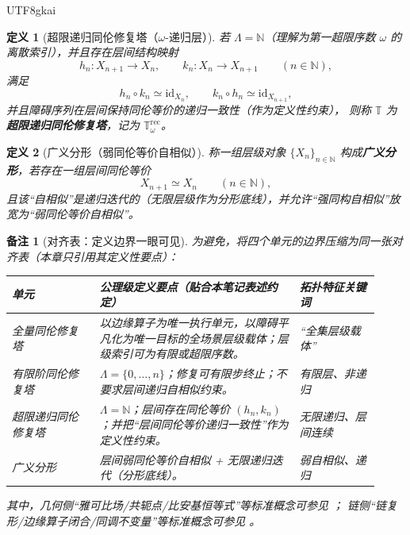 \documentclass[12pt]{article}
\newtheorem{definition}{定义}[section]
\newtheorem{remark}{备注}[section]
\newcommand{\NN}{\mathbb{N}}
\newcommand{\KouJing}{\texorpdfstring{表述约定}{表述约定}}
\begin{document}
\begin{CJK*}{UTF8}{gkai}
\begin{definition}[超限递归同伦修复塔（$\omega$-递归层）]
若 $\Lambda=\NN$（理解为第一超限序数 $\omega$ 的离散索引），并且存在层间结构映射
\[
  h_n:X_{n+1}\to X_n,\qquad
  k_n:X_n\to X_{n+1}\qquad (n\in\NN),
\]
满足
\[
  h_n\circ k_n\simeq \mathrm{id}_{X_n},
  \qquad
  k_n\circ h_n\simeq \mathrm{id}_{X_{n+1}},
\]
并且障碍序列在层间保持同伦等价的递归一致性（作为定义性约束），
则称 $\mathbb{T}$ 为\textbf{超限递归同伦修复塔}，记为 $\mathbb{T}_{\omega}^{\mathrm{rec}}$。
\end{definition}

\begin{definition}[广义分形（弱同伦等价自相似）]
称一组层级对象 $\{X_n\}_{n\in\NN}$ 构成\textbf{广义分形}，若存在一组层间同伦等价
\[
  X_{n+1}\simeq X_n\qquad (n\in\NN),
\]
且该“自相似”是递归迭代的（无限层级作为分形底线），并允许“强同构自相似”放宽为“弱同伦等价自相似”。
\end{definition}

\begin{remark}[对齐表：定义边界一眼可见]
为避免，将四个单元的边界压缩为同一张对齐表（本章只引用其定义性要点）：
\begin{center}
\renewcommand{\arraystretch}{1.25}
\begin{tabular}{|p{0.22\linewidth}|p{0.50\linewidth}|p{0.20\linewidth}|}
\hline
\textbf{单元} & \textbf{公理级定义要点（贴合本笔记\KouJing）} & \textbf{拓扑特征关键词} \\
\hline
全量同伦修复塔 &
以边缘算子为唯一执行单元，以障碍平凡化为唯一目标的全场景层级载体；层级索引可为有限或超限序数。 &
“全集层级载体” \\
\hline
有限阶同伦修复塔 &
$\Lambda=\{0,\dots,n\}$；修复可有限步终止；不要求层间递归自相似约束。 &
有限层、非递归 \\
\hline
超限递归同伦修复塔 &
$\Lambda=\NN$；层间存在同伦等价 $(h_n,k_n)$；并把“层间同伦等价递归一致性”作为定义性约束。 &
无限递归、层间连续 \\
\hline
广义分形 &
层间弱同伦等价自相似 + 无限递归迭代（分形底线）。 &
弱自相似、递归 \\
\hline
\end{tabular}
\end{center}
其中，几何侧“雅可比场/共轭点/比安基恒等式”等标准概念可参见 \cite{Lee2018RiemannianManifolds,Petersen2016RiemannianGeometry}；
链侧“链复形/边缘算子闭合/同调不变量”等标准概念可参见 \cite{Hatcher2002AT,Weibel1994HomologicalAlgebra}。
\end{remark}


\end{CJK*}
\end{document}
